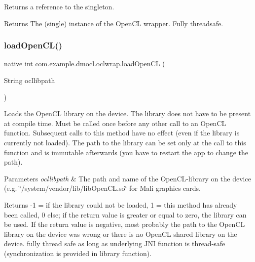 Returns a reference to the singleton. \begin{DoxyReturn}{Returns}
The (single) instance of the Open\+CL wrapper.  Fully threadsafe. 
\end{DoxyReturn}
\mbox{\label{classcom_1_1example_1_1dmocl_1_1oclwrap_ac410aa241e771d4b1962636fa9f04e24}} 
\subsubsection{\texorpdfstring{load\+Open\+C\+L()}{loadOpenCL()}}
{\footnotesize\ttfamily native int com.\+example.\+dmocl.\+oclwrap.\+load\+Open\+CL (\begin{DoxyParamCaption}\item[{String}]{ocllibpath }\end{DoxyParamCaption})}

Loads the Open\+CL library on the device. The library does not have to be present at compile time. Must be called once before any other call to an Open\+CL function. Subsequent calls to this method have no effect (even if the library is currently not loaded). The path to the library can be set only at the call to this function and is immutable afterwards (you have to restart the app to change the path). 
\begin{DoxyParams}{Parameters}
{\em ocllibpath} & The path and name of the Open\+C\+L-\/library on the device (e.\+g. \char`\"{}/system/vendor/lib/lib\+Open\+C\+L.\+so\char`\"{} for Mali graphics cards. \\
\hline
\end{DoxyParams}
\begin{DoxyReturn}{Returns}
-\/1 = if the library could not be loaded, 1 = this method has already been called, 0 else; if the return value is greater or equal to zero, the library can be used. If the return value is negative, most probably the path to the Open\+CL library on the device was wrong or there is no Open\+CL shared library on the device.  fully thread safe as long as underlying J\+NI function is thread-\/safe (synchronization is provided in library function). 
\end{DoxyReturn}
\mbox{\label{classcom_1_1example_1_1dmocl_1_1oclwrap_aa98cb05829d56c9bdc773eeda8911d2c}} 
